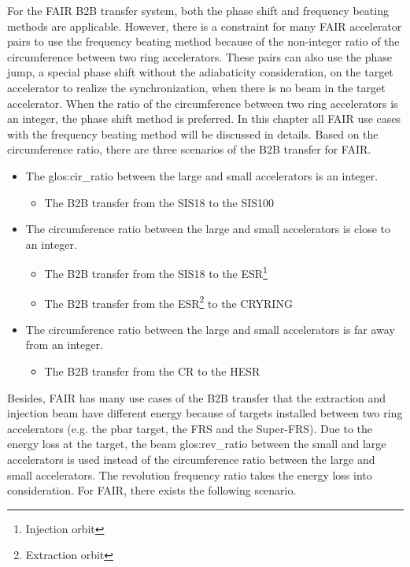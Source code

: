 For the FAIR B2B transfer system, both the phase shift and frequency beating methods are applicable. However, there is a constraint for many FAIR accelerator pairs to use the frequency beating method because of the non-integer ratio of the circumference between two ring accelerators. These pairs can also use the phase jump, a special phase shift without the adiabaticity consideration, on the target accelerator to realize the synchronization, when there is no beam in the target accelerator.  When the ratio of the circumference between two ring accelerators is an integer, the phase shift method is preferred. In this chapter all FAIR use cases with the frequency beating method will be discussed in details. Based on the circumference ratio, there are three scenarios of the B2B transfer for FAIR. 
\begin{itemize}
	\item The \gls{glos:cir_ratio} between the large and small accelerators is an integer.
		\begin{itemize}
			\item	The B2B transfer from the SIS18 to the SIS100

		\end{itemize}
	\item The circumference ratio between the large and small accelerators is close to an integer.
		\begin{itemize}
			\item The B2B transfer from the SIS18 to the ESR\footnote{Injection orbit}
			\item The B2B transfer from the ESR\footnote{Extraction orbit} to the CRYRING
		\end{itemize}
 	\item The circumference ratio between the large and small accelerators is far away from an integer.
		\begin{itemize}
			\item The B2B transfer from the CR to the HESR
		\end{itemize}
\end{itemize}
Besides, FAIR has many use cases of the B2B transfer that the extraction and injection beam have different energy because of targets installed between two ring accelerators (e.g. the pbar target, the FRS and the Super-FRS). Due to the energy loss at the target, the beam \gls{glos:rev_ratio} between the small and large accelerators is used instead of the circumference ratio between the large and small accelerators. The revolution frequency ratio takes the energy loss into consideration. For FAIR, there exists the following scenario.


